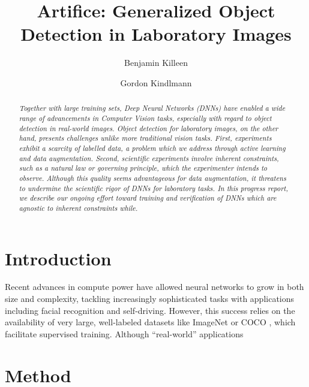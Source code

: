 \documentclass[twocolumn, 10pt]{asme2ej}
\title{Artifice: Generalized Object Detection in Laboratory Images}
\author{Benjamin Killeen
  \affiliation{
    \href{mailto:killeen@uchicago.edu}{killeen@uchicago.edu}
  }
}
\author{Gordon Kindlmann \affiliation{
    \href{mailto:glk@uchicago.edu}{glk@uchicago.edu}
  }
}
\begin{document}
\maketitle

\begin{abstract}
  {\it Together with large training sets, Deep Neural Networks (DNNs) have
    enabled a wide range of advancements in Computer Vision tasks, especially
    with regard to object detection in real-world images. Object detection for
    laboratory images, on the other hand, presents challenges unlike more
    traditional vision tasks. First, experiments exhibit a scarcity of labelled
    data, a problem which we address through active learning and data
    augmentation. Second, scientific experiments involve inherent constraints,
    such as a natural law or governing principle, which the experimenter intends
    to observe. Although this quality seems advantageous for data augmentation,
    it threatens to undermine the scientific rigor of DNNs for laboratory
    tasks. In this progress report, we describe our ongoing effort toward
    training and verification of DNNs which are agnostic to inherent constraints
    while.}
\end{abstract}

\section{Introduction}
\label{sec:introduction}

Recent advances in compute power have allowed neural networks to grow in both
size and complexity, tackling increasingly sophisticated tasks with applications
including facial recognition and self-driving. However, this success relies on
the availability of very large, well-labeled datasets like ImageNet
\cite{deng_imagenet:_nodate} or COCO \cite{lin_microsoft_2014}, which facilitate
supervised training. Although ``real-world'' applications 

\section{Method}
\label{sec:method}
\end{document}

